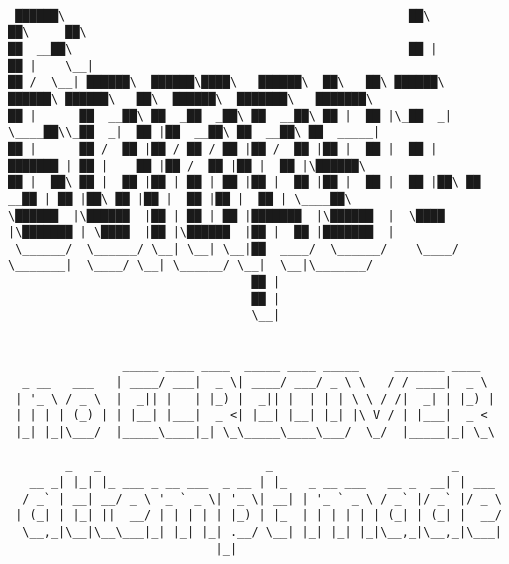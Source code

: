 \documentclass[varwidth=\maxdimen,margin=0.5cm,multi={verbatim}]{standalone}
\begin{document}
\begin{verbatim}




 ██████\                                                ██\                ██\     ██\
██  __██\                                               ██ |               ██ |    \__|
██ /  \__| ██████\  ██████\████\   ██████\  ██\   ██\ ██████\    ██████\ ██████\   ██\  ██████\  ███████\   ███████\
██ |      ██  __██\ ██  _██  _██\ ██  __██\ ██ |  ██ |\_██  _|   \____██\\_██  _|  ██ |██  __██\ ██  __██\ ██  _____|
██ |      ██ /  ██ |██ / ██ / ██ |██ /  ██ |██ |  ██ |  ██ |     ███████ | ██ |    ██ |██ /  ██ |██ |  ██ |\██████\
██ |  ██\ ██ |  ██ |██ | ██ | ██ |██ |  ██ |██ |  ██ |  ██ |██\ ██  __██ | ██ |██\ ██ |██ |  ██ |██ |  ██ | \____██\
\██████  |\██████  |██ | ██ | ██ |███████  |\██████  |  \████  |\███████ | \████  |██ |\██████  |██ |  ██ |███████  |
 \______/  \______/ \__| \__| \__|██  ____/  \______/    \____/  \_______|  \____/ \__| \______/ \__|  \__|\_______/
                                  ██ |
                                  ██ |
                                  \__|


                _____ ____ ____  _____ ____ _____     _______ ____
  _ __   ___   | ____/ ___|  _ \| ____/ ___/ _ \ \   / / ____|  _ \
 | '_ \ / _ \  |  _|| |   | |_) |  _|| |  | | | \ \ / /|  _| | |_) |
 | | | | (_) | | |__| |___|  _ <| |__| |__| |_| |\ V / | |___|  _ <
 |_| |_|\___/  |_____\____|_| \_\_____\____\___/  \_/  |_____|_| \_\

        _   _                       _                         _
   __ _| |_| |_ ___ _ __ ___  _ __ | |_   _ __ ___   __ _  __| | ___
  / _` | __| __/ _ \ '_ ` _ \| '_ \| __| | '_ ` _ \ / _` |/ _` |/ _ \
 | (_| | |_| ||  __/ | | | | | |_) | |_  | | | | | | (_| | (_| |  __/
  \__,_|\__|\__\___|_| |_| |_| .__/ \__| |_| |_| |_|\__,_|\__,_|\___|
                             |_|


\end{verbatim}
\end{document}
